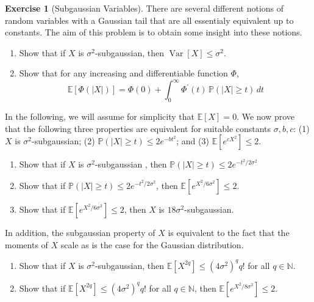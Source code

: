 \documentclass{article}
\DeclareMathOperator{\Var}{Var}
\theoremstyle{definition}
\newtheorem{exercise}{Exercise}[section]
\theoremstyle{remark}
\theoremstyle{definition}
\begin{document}
\begin{exercise}[Subgaussian Variables]
There are several different notions of random variables with a Gaussian tail that are all essentialy equivalent up to constants. The aim of this problem is to obtain some insight into these notions. 
\begin{enumerate}
    \item Show that if $X$ is $\sigma^2$-subgaussian, then $\Var[X] \leq \sigma^2$. 
    \item Show that for any increasing and differentiable function $\Phi$, 
    \[\mathbb{E}[ \Phi(|X|)] = \Phi(0) + \int_0^\infty \Phi^\prime (t) \, \mathbb{P}(|X| \geq t) \, dt\]
\end{enumerate}
In the following, we will assume for simplicity that $\mathbb{E}[X] = 0$. We now prove that the following three properties are equivalent for suitable constants $\sigma, b, c$: (1) $X$ is $\sigma^2$-subgaussian; (2) $\mathbb{P}(|X| \geq t) \leq 2 e^{-b t^2}$; and (3) $\mathbb{E}[e^{c X^2}] \leq 2$. 
\begin{enumerate}[resume]
    \item Show that if $X$ is $\sigma^2$-subgaussian , then $\mathbb{P}(|X| \geq t) \leq 2 e^{-t^2 / 2 \sigma^2}$ 
    \item Show that if $\mathbb{P}(|X| \geq t) \leq 2 e^{- t^2 / 2 \sigma^2}$, then $\mathbb{E}[e^{X^2 / 6 \sigma^2} ] \leq 2$. 
    \item Show that if $\mathbb{E}[e^{X^2 / 6 \sigma^2}] \leq 2$, then $X$ is $18 \sigma^2$-subgaussian. 
\end{enumerate}
In addition, the subgaussian property of $X$ is equivalent to the fact that the moments of $X$ scale as is the case for the Gaussian distribution. 
\begin{enumerate}[resume]
    \item Show that if $X$ is $\sigma^2$-subgaussian, then $\mathbb{E}[X^{2q}] \leq (4 \sigma^2)^q q!$ for all $q \in \mathbb{N}$. 
    \item Show that if $\mathbb{E}[X^{2q}] \leq (4 \sigma^2)^q q!$ for all $q \in \mathbb{N}$, then $\mathbb{E}[e^{X^2 / 8 \sigma^2}] \leq 2$. 
\end{enumerate}
\end{exercise}
\end{document}
